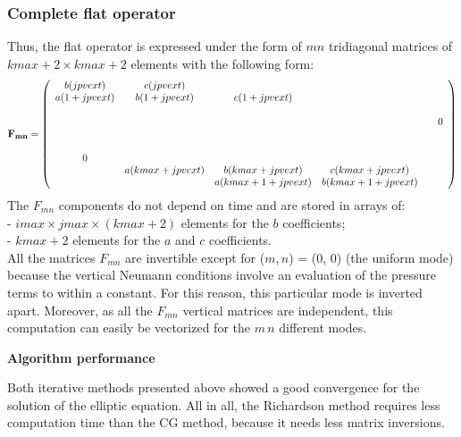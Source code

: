 \subsubsection{Complete flat operator}
Thus, the flat operator is expressed under the form of $m n$ tridiagonal
matrices of $kmax+2 \times kmax+2$ elements with the following form:
\begin{displaymath}
{\bf F_{mn}}=
\left(
\begin{array}{cccccc}
b(jpvext) & c(jpvext)         &   &   &   &   \\
a(1+jpvext) & b(1+jpvext) & c(1+jpvext)          &   &   &   \\
     &      &                &   &   &   \\
     &      &             &   &   & \huge{0}  \\
     &      &                 &   &   &   \\
     &      &                 &   &   &   \\
\huge{0}     &      &               &   &   &   \\
     &  a(kmax+jpvext)    &  b(kmax+jpvext)         &  c(kmax+jpvext)&   &   \\
     &      &                      a(kmax+1+jpvext) &  b(kmax+1+jpvext) & &\\
\end{array}
\right)
\end{displaymath}
The $ F_{mn}$ components do not depend on time and are
stored in arrays of:\\
- $imax \times jmax \times (kmax+2)$ elements for the $b$ coefficients;\\
- $kmax+2$ elements for the $a$ and $c$ coefficients.\\
All the matrices $F_{mn}$ are invertible except for
($m, n$) = (0, 0) (the uniform mode) because the vertical Neumann conditions
involve an evaluation of the pressure terms to within a constant.
For this reason, this particular mode is inverted apart. Moreover, as all the
$F_{mn}$ vertical matrices are independent,
this computation can easily be vectorized for the $m \, n$ different modes.

{\bf Algorithm performance}

Both iterative methods presented above showed a good convergence for the
solution of the elliptic equation. All in all, the Richardson method
requires less computation time than the CG method, because it needs less
matrix inversions.

